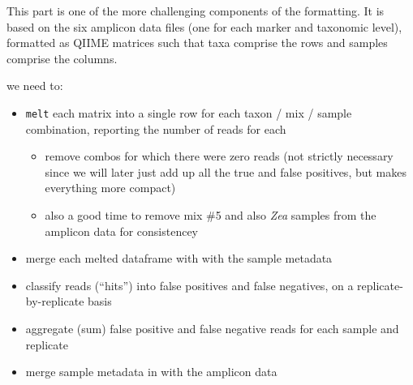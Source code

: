\documentclass[
]{article}
\providecommand{\tightlist}{%
  \setlength{\itemsep}{0pt}\setlength{\parskip}{0pt}}
\begin{document}
This part is one of the more challenging components of the formatting.
It is based on the six amplicon data files (one for each marker and
taxonomic level), formatted as QIIME matrices such that taxa comprise
the rows and samples comprise the columns.

we need to:

\begin{itemize}
\tightlist
\item
  \texttt{melt} each matrix into a single row for each taxon / mix /
  sample combination, reporting the number of reads for each

  \begin{itemize}
  \tightlist
  \item
    remove combos for which there were zero reads (not strictly
    necessary since we will later just add up all the true and false
    positives, but makes everything more compact)
  \item
    also a good time to remove mix \#5 and also \emph{Zea} samples from
    the amplicon data for consistencey
  \end{itemize}
\item
  merge each melted dataframe with with the sample metadata
\item
  classify reads (``hits'') into false positives and false negatives, on
  a replicate-by-replicate basis
\item
  aggregate (sum) false positive and false negative reads for each
  sample and replicate
\item
  merge sample metadata in with the amplicon data
\end{itemize}
\end{document}
